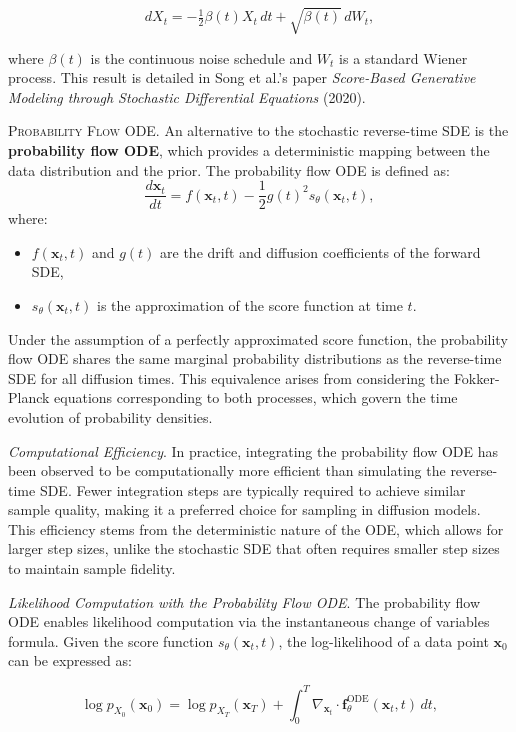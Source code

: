 \[
dX_t = -\tfrac{1}{2} \beta(t) X_t \, dt + \sqrt{\beta(t)} \, dW_t,
\]

\noindent where \( \beta(t) \) is the continuous noise schedule and \( W_t \) is a standard Wiener process. This result is detailed in Song et al.'s paper \textit{Score-Based Generative Modeling through Stochastic Differential Equations} (2020).

\textsc{Probability Flow ODE.} An alternative to the stochastic reverse-time SDE is the \textbf{probability flow ODE}, which provides a deterministic mapping between the data distribution and the prior. The probability flow ODE is defined as:
\[
\frac{d\mathbf{x}_t}{dt} = f(\mathbf{x}_t, t) - \frac{1}{2} g(t)^2 s_\theta(\mathbf{x}_t, t),
\]
where:
\begin{itemize}
    \item \( f(\mathbf{x}_t, t) \) and \( g(t) \) are the drift and diffusion coefficients of the forward SDE,
    \item \( s_\theta(\mathbf{x}_t, t) \) is the approximation of the score function at time \(t\).
\end{itemize}

Under the assumption of a perfectly approximated score function, the probability flow ODE shares the same marginal probability distributions as the reverse-time SDE for all diffusion times. This equivalence arises from considering the Fokker-Planck equations corresponding to both processes, which govern the time evolution of probability densities.

\textit{Computational Efficiency}. In practice, integrating the probability flow ODE has been observed to be computationally more efficient than simulating the reverse-time SDE. Fewer integration steps are typically required to achieve similar sample quality, making it a preferred choice for sampling in diffusion models. This efficiency stems from the deterministic nature of the ODE, which allows for larger step sizes, unlike the stochastic SDE that often requires smaller step sizes to maintain sample fidelity.

\textit{Likelihood Computation with the Probability Flow ODE}. The probability flow ODE enables likelihood computation via the instantaneous change of variables formula. Given the score function \( s_\theta(\mathbf{x}_t, t) \), the log-likelihood of a data point \( \mathbf{x}_0 \) can be expressed as:

\[
\log p_{X_0}(\mathbf{x}_0) = \log p_{X_T}(\mathbf{x}_T) + \int_0^T \nabla_{\mathbf{x}_t} \cdot \mathbf{f}_\theta^{\text{ODE}}(\mathbf{x}_t, t) \, dt,
\]


